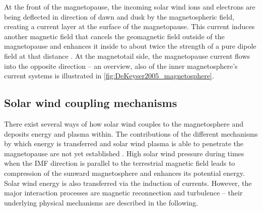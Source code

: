 At the front of the magnetopause, the incoming solar wind ions and electrons are being deflected in direction of dawn and dusk by the magnetospheric field, creating a current layer at the surface of the magnetopause. This current induces another magnetic field that cancels the geomagnetic field outside of the magnetopause and enhances it inside to about twice the strength of a pure dipole field at that distance \citep{DeKeyser2005}. At the magnetotail side, the magnetopause current flows into the opposite direction -- an overview, also of the inner magnetosphere's current systems is illustrated in \autoref{fig:DeKeyser2005_magnetosphere}.
\begin{figure}[htb]
\end{figure}


\subsection{Solar wind coupling mechanisms}
\label{sec:solar_wind_coupling_mechanisms}
There exist several ways of how solar wind couples to the magnetosphere and deposits energy and plasma within. The contributions of the different mechanisms by which energy is transferred and solar wind plasma is able to penetrate the magnetopause are not yet established \citep{Phan2005}. High solar wind pressure during times when the IMF direction is parallel to the terrestrial magnetic field leads to compression of the sunward magnetosphere and enhances its potential energy. Solar wind energy is also transferred via the induction of currents. However, the major interaction processes are magnetic reconnection and turbulence -- their underlying physical mechanisms are described in the following.

